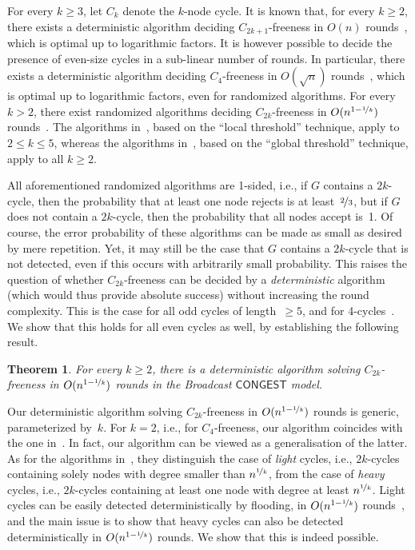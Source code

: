 \documentclass{article}
\newcommand{\CONGEST}{\textsf{CONGEST}}
\newtheorem{theorem}{Theorem}
\begin{document}
For every $k\geq 3$, let $C_k$ denote the $k$-node cycle. It is known that, for every $k\geq 2$, there exists a deterministic algorithm deciding $C_{2k+1}$-freeness in $O(n)$ rounds~\cite{KorhonenR17}, which is optimal up to logarithmic factors. It is however possible to decide the presence of even-size cycles in a sub-linear number of rounds. In particular, there exists a deterministic algorithm deciding $C_4$-freeness in $O(\sqrt{n})$ rounds~\cite{DruckerKO13}, which is optimal up to logarithmic factors, even for randomized algorithms. For every $k>2$, there exist randomized algorithms deciding $C_{2k}$-freeness in $O(n^{1-\nicefrac{1}{k}})$ rounds~\cite{Censor-HillelFG20,FraigniaudLMT24}. The algorithms in~\cite{Censor-HillelFG20}, based on the ``local threshold'' technique, apply to $2\leq k\leq 5$, whereas the algorithms in~\cite{FraigniaudLMT24}, based on the ``global threshold'' technique, apply to all $k\geq 2$. 

All aforementioned randomized algorithms are 1-sided, i.e., if $G$ contains a  $2k$-cycle, then the probability that at least one node rejects is at least~$\nicefrac23$, but if $G$ does not contain a  $2k$-cycle, then the probability that all nodes accept is~1. Of course, the error probability of these algorithms can be made as small as desired by mere repetition. Yet, it may still be the case that $G$ contains a $2k$-cycle that is not detected, even if this occurs with arbitrarily small probability. This raises the question of whether  $C_{2k}$-freeness can be decided by a \emph{deterministic} algorithm (which would thus provide absolute success) without increasing the round complexity. This is the case for all odd cycles of length~$\geq 5$, and for 4-cycles~\cite{DruckerKO13,KorhonenR17}. We show that this holds for all even cycles as well, by establishing the following result. 

\begin{theorem}\label{theo:c2k}
    For every $k\geq 2$, there is a deterministic algorithm solving $C_{2k}$-freeness in $O(n^{1-\nicefrac{1}{k}})$ rounds in the Broadcast $\CONGEST$ model. 
\end{theorem}

Our deterministic algorithm solving $C_{2k}$-freeness in $O(n^{1-\nicefrac{1}{k}})$ rounds is generic, parameterized by~$k$. For $k=2$, i.e., for $C_4$-freeness, our algorithm coincides with the one in~\cite{DruckerKO13}. In fact, our algorithm can be viewed as a generalisation of the latter. As for the algorithms in~\cite{Censor-HillelFG20,FraigniaudLMT24}, they distinguish the case of \emph{light} cycles, i.e., $2k$-cycles containing solely nodes with degree smaller than $n^{\nicefrac{1}{k}}$, from the case of \emph{heavy} cycles, i.e., $2k$-cycles containing at least one node with degree at least $n^{\nicefrac{1}{k}}$. Light cycles can be easily detected deterministically by flooding, in $O(n^{1-\nicefrac{1}{k}})$ rounds~\cite{Censor-HillelFG20,FraigniaudLMT24}, and the main issue is to show that heavy cycles can also be detected deterministically in $O(n^{1-\nicefrac{1}{k}})$ rounds. We show that this is indeed possible. 
\end{document}
